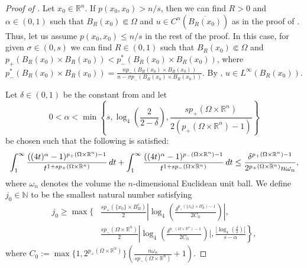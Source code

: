 \documentclass[11pt]{amsart}
\theoremstyle{plain}
\theoremstyle{definition}
\numberwithin{equation}{section}
\renewcommand{\d}{\textnormal{d}}
\newcommand{\N}{\mathbb{N}}
\newcommand{\R}{\mathbb{R}}
\begin{document}
\begin{proof} [Proof of ]
Let $x_0\in\R^n$. If $p(x_0, x_0) > n/s$, then we can find $R > 0$ and $\alpha \in (0,1)$ such that $B_R(x_0) \Subset \Omega$ and $u \in C^\alpha(\overline{B_{R}(x_0)})$ as in the proof of . Thus, let us assume $p(x_0, x_0) \leq n/s$ in the rest of the proof. In this case, for given $\sigma \in (0,s)$ we can find $R \in (0,1)$ such that $B_R(x_0) \Subset \Omega$ and $p_+(B_R(x_0)\times B_R(x_0)) < p_-^{\ast}(B_R(x_0)\times B_R(x_0))$, where $p_-^{\ast}(B_R(x_0)\times B_R(x_0))= \frac{np_-(B_R(x_0)\times B_R(x_0))}{n-\sigma p_-(B_R(x_0)\times B_R(x_0))}$. By , $u\in L^{\infty}(B_R(x_0))$.

Let $\delta\in(0,1)$ be the constant from  and let 
\begin{equation}\label{eq:alphabounds}
0<\alpha < \min\left\{ s,\log_4\left(\frac{2}{2-\delta}\right), \frac{sp_{+}(\Omega\times\R^n)}{2(p_{+}(\Omega\times\R^n)-1)}\right\}
\end{equation}
be chosen such that the following is satisfied:
\begin{equation}\label{eq:propalpha1}
\int^{\infty}_1 \frac{((4t)^{\alpha} - 1)^{p_{+}(\Omega\times \R^n)-1}}{t^{1+sp_{+}(\Omega\times\R^n)}}\, \d t + \int^{\infty}_1 \frac{((4t)^{\alpha} - 1)^{p_{-}(\Omega\times \R^n)-1}}{t^{1+sp_{-}(\Omega\times\R^n)}}\, \d t \leq \frac{\delta^{p_{+}(\Omega\times\R^n)-1}}{2^{p_{+}(\Omega\times\R^n)}n\omega_n},
\end{equation}
where $\omega_n$ denotes the volume the $n$-dimensional Euclidean unit ball.
We define $j_0\in\N$ to be the smallest natural number satisfying
\begin{equation}\label{eq:j0}
\begin{aligned}
j_0\geq \max\Bigg\{ &\frac{sp_{+}(\lbrace x_0 \rbrace \times B_R^c)}{2}\left|\log_4\left(\frac{\delta^{p_{+}(\lbrace x_0 \rbrace \times B_R^c)-1}}{2C_0}\right) \right|, \\
&\frac{sp_{-}(\Omega \times \R^n)}{2}\left|\log_4\left(\frac{\delta^{p_{-}(\Omega \times \R^n)-1}}{2C_0}\right) \Bigg|, \frac{|\log_4 (\frac{\delta}{2})|}{s-\alpha} \right\},
\end{aligned}
\end{equation}
where $C_0:=\max\{1,2^{p_{+}(\Omega\times\R^n)}\}\left(\frac{n\omega_n}{sp_{-}(\Omega\times\R^n)}+1\right)$.


\end{proof}
\end{document}

